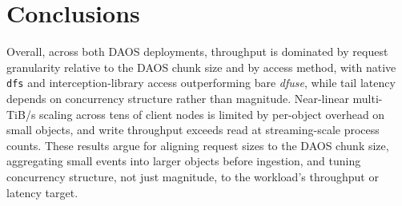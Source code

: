 \section{Conclusions}
\label{sec:conclusion}

Overall, across both DAOS deployments, throughput is dominated by request granularity relative to the DAOS chunk size and by access method, with native \texttt{dfs} and interception-library access outperforming bare \textit{dfuse}, while tail latency depends on concurrency structure rather than magnitude. Near-linear multi-TiB/s scaling across tens of client nodes is limited by per-object overhead on small objects, and write throughput exceeds read at streaming-scale process counts. These results argue for aligning request sizes to the DAOS chunk size, aggregating small events into larger objects before ingestion, and tuning concurrency structure, not just magnitude, to the workload's throughput or latency target.

